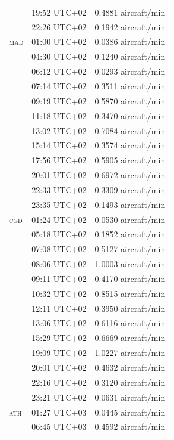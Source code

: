 \documentclass[]{elsarticle}
\newcommand{\airp}[1]{\textcolor{#1}{\textsc{#1}}}
\begin{document}
\begin{center}
\begin{longtable}{lll}
           & 19:52 UTC+02 &  0.4881 aircraft/min \\
           & 22:26 UTC+02 &  0.1942 aircraft/min \\
      \airp{mad} & 01:00 UTC+02 &  0.0386 aircraft/min \\
           & 04:30 UTC+02 &  0.1240 aircraft/min \\
           & 06:12 UTC+02 &  0.0293 aircraft/min \\
           & 07:14 UTC+02 &  0.3511 aircraft/min \\
           & 09:19 UTC+02 &  0.5870 aircraft/min \\
           & 11:18 UTC+02 &  0.3470 aircraft/min \\
           & 13:02 UTC+02 &  0.7084 aircraft/min \\
           & 15:14 UTC+02 &  0.3574 aircraft/min \\
           & 17:56 UTC+02 &  0.5905 aircraft/min \\
           & 20:01 UTC+02 &  0.6972 aircraft/min \\
           & 22:33 UTC+02 &  0.3309 aircraft/min \\
           & 23:35 UTC+02 &  0.1493 aircraft/min \\
      \airp{cgd} & 01:24 UTC+02 &  0.0530 aircraft/min \\
           & 05:18 UTC+02 &  0.1852 aircraft/min \\
           & 07:08 UTC+02 &  0.5127 aircraft/min \\
           & 08:06 UTC+02 &  1.0003 aircraft/min \\
           & 09:11 UTC+02 &  0.4170 aircraft/min \\
           & 10:32 UTC+02 &  0.8515 aircraft/min \\
           & 12:11 UTC+02 &  0.3950 aircraft/min \\
           & 13:06 UTC+02 &  0.6116 aircraft/min \\
           & 15:29 UTC+02 &  0.6669 aircraft/min \\
           & 19:09 UTC+02 &  1.0227 aircraft/min \\
           & 20:01 UTC+02 &  0.4632 aircraft/min \\
           & 22:16 UTC+02 &  0.3120 aircraft/min \\
           & 23:21 UTC+02 &  0.0631 aircraft/min \\
      \airp{ath} & 01:27 UTC+03 &  0.0445 aircraft/min \\
           & 06:45 UTC+03 &  0.4592 aircraft/min \\

\end{longtable}
\end{center}
\end{document}
